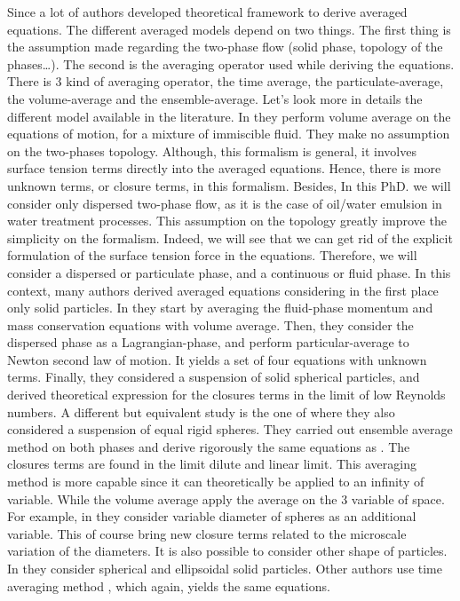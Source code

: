 Since \citet{batchelor1970stress} a lot of authors developed theoretical framework to derive averaged equations.
The different averaged models depend on two things.
The first thing is the assumption made regarding the two-phase flow (solid phase, topology of the phases\ldots).
The second is the  averaging operator used while deriving the equations. 
There is $3$ kind of averaging operator, the time average, the particulate-average, the volume-average and the ensemble-average. 
Let's look more in details the different model available in the literature. 
In \citet{drew1983mathematical} they perform volume average on the equations of motion, for a mixture of immiscible fluid. 
They make no assumption on the two-phases topology.
Although, this formalism is general, it involves surface tension terms directly into the averaged equations. 
Hence, there is more unknown terms, or closure terms, in this formalism.
Besides, In this PhD. we will consider only dispersed two-phase flow, as it is the case of oil/water emulsion in water treatment processes. 
This assumption on the topology greatly improve the simplicity on the formalism. 
Indeed, we will see that we can get rid of the explicit formulation of the surface tension force in the equations.
Therefore, we will consider a dispersed or particulate phase, and a continuous or fluid phase.
In this context, many authors derived averaged equations considering in the first place only solid particles.
In \citet{jackson1997locally} they start by averaging the fluid-phase momentum and mass conservation equations with volume average.
Then, they consider the dispersed phase as a Lagrangian-phase, and perform particular-average to Newton second law of motion.  
It yields a set of four equations with unknown terms. 
Finally, they considered a suspension of solid spherical particles, and derived theoretical expression for the closures terms in the limit of low Reynolds numbers.
A different but equivalent study is the one of \citet{zhang1994averaged} where they also considered a suspension of equal rigid spheres.
They carried out ensemble average method on both phases and derive rigorously the same equations as \citet{jackson1997locally}.
The closures terms are found in the limit dilute and linear limit. 
This averaging method is more capable since it can theoretically be applied to an infinity of variable.
While the volume average apply the average on the 3 variable of space.  
For example, in \citet{zhang1994ensemble} they consider variable diameter of spheres as an additional variable. 
This of course bring new closure terms related to the microscale variation of the diameters.
It is also possible to consider other shape of particles.
In \citet{batchelor1970stress} they consider spherical and ellipsoidal solid particles. 
Other authors use time averaging method \citep{ishii2010thermo}, which again, yields the same equations. 

